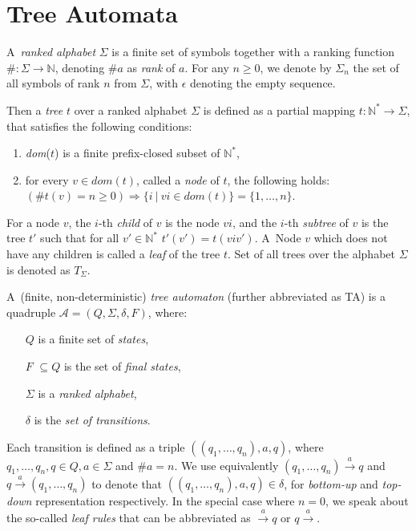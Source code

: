  \section{Tree Automata}

 A~\emph{ranked alphabet} $\Sigma$ is a finite set of symbols together with a ranking function $\#: \Sigma \to \mathbb{N}$, denoting $\#a$ as \emph{rank} of $a$. For any $n \geq 0$, we denote by $\Sigma_n$ the set of all symbols of rank $n$ from $\Sigma$, with $\epsilon$ denoting the empty sequence.

Then a \emph{tree} $t$ over a ranked alphabet $\Sigma$ is defined as a partial mapping $t : \mathbb{N}^* \to \Sigma$, that satisfies the following conditions:
 \begin{enumerate}
  \item \emph{dom}($t$) is a finite prefix-closed subset of $\mathbb{N}^*$,
	\item for every $v \in dom(t)$, called a \emph{node} of $t$, the following holds: $(\#t(v) = n \geq 0) \Longrightarrow \{i\ |\ vi \in dom(t)\} = \{1,\ldots,n\}$. 
 \end{enumerate}

For a node $v$, the $i$-th \emph{child} of $v$ is the node $vi$, and the $i$-th \emph{subtree} of $v$ is the tree $t'$ such that for all $v' \in \mathbb{N}^*$ $t'(v') = t(viv')$. A~Node $v$ which does not have any children is called a \emph{leaf} of the tree $t$. Set of all trees over the alphabet $\Sigma$ is denoted as $T_\Sigma$.

A~(finite, non-deterministic) \emph{tree automaton} (further abbreviated as TA) is a quadruple $\mathcal{A} = (Q, \Sigma, \delta, F)$, where:
 \begin{itemize}
  \item[$Q$] is a finite set of \emph{states},
	\item[$F$] $ \subseteq Q$ is the set of \emph{final states},
	\item[$\Sigma$] is a \emph{ranked alphabet},
	\item[$\delta$] is the \emph{set of transitions}.
 \end{itemize}

Each transition is defined as a triple $((q_1,\ldots,q_n), a, q)$, where $q_1,\ldots,q_n,q \in Q, a \in \Sigma$ and $\#a = n$. We use equivalently $(q_1,\ldots,q_n) \overset{a}{\longrightarrow} q$ and $q \overset{a}{\longrightarrow}  (q_1,\ldots,q_n)$ to denote that $((q_1,\ldots,q_n), a, q) \in \delta$, for \emph{bottom-up} and \emph{top-down} representation respectively. In the special case where $n = 0$, we speak about the so-called \emph{leaf rules} that can be abbreviated as $\overset{a}{\longrightarrow}  q$ or $q \overset{a}{\longrightarrow} $.

